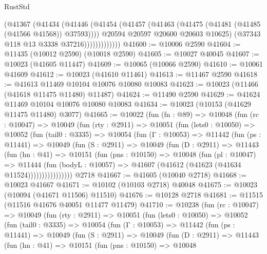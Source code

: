 \begin{lexlean}{RustStd}
\begin{coremodule}
                      (@41367
                        (@41434
                          (@41446
                            (@41454
                              (@41457 (@41463 (@41475 (@41481 (@41485 (@41566 @41568)) @37593))))
                              @20594
                              @20597
                              @20600
                              @20603
                              @10625)
                            (@37343 @118 @13 @3338 @37216)))))))))))))
@41600 := @10006 @2590
@41604 := @11435 (@10012 @2590) (@10018 @2590)
@41605 := @10027 @40045
@41607 := @10023 (@41605 @11447)
@41609 := @10065 (@10066 @2590)
@41610 := @10061 @41609
@41612 := @10023 (@41610 @11461)
@41613 := @11467 @2590
@41618 := @41613 @11469 @10104 @10076 @10080 @10083
@41623 := @10023 (@11466 (@41618 @11475 @11480) @11487)
@41624 := @11490 @2590
@41629 := @41624 @11469 @10104 @10076 @10080 @10083
@41634 := @10023 (@10153 (@41629 @11475 @11480) @3077)
@41665 := @10022
    (fun (fn : @89) =>
    @10048
      (fun (rc : @10047) =>
      @10049
        (fun (rty : @2911) =>
        @10051
          (fun (lets0 : @10050) =>
          @10052
            (fun (tail0 : @3335) =>
            @10054
              (fun (Γ : @10053) =>
              @11442
                (fun (ps : @11441) =>
                @10049
                  (fun (S : @2911) =>
                  @10049
                    (fun (D : @2911) =>
                    @11443
                      (fun (hn : @41) =>
                      @10151
                        (fun (pns : @10150) =>
                        @10048
                          (fun (pl : @10047) =>
                          @11444
                            (fun (bodyL : @10057) =>
                            @41607 (@41612 (@41623 (@41634 @11524))))))))))))))))
    @2718
@41667 := @41605 (@10040 @2718)
@41668 := @10023 @41667
@41671 := @10102 (@10103 @2718) @40048
@41675 := @10023 (@10094 (@41671 @11506) @11510)
@41676 := @10128 @2718
@41681 := @11515 (@11516 @41676 @40051 @11477 @11479)
@41710 := @10238
    (fun (rc : @10047) =>
    @10049
      (fun (rty : @2911) =>
      @10051
        (fun (lets0 : @10050) =>
        @10052
          (fun (tail0 : @3335) =>
          @10054
            (fun (Γ : @10053) =>
            @11442
              (fun (ps : @11441) =>
              @10049
                (fun (S : @2911) =>
                @10049
                  (fun (D : @2911) =>
                  @11443
                    (fun (hn : @41) =>
                    @10151
                      (fun (pns : @10150) =>
                      @10048

\end{coremodule}
\end{lexlean}
